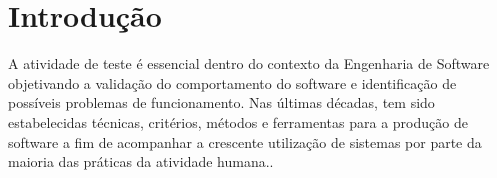 \chapter[Introdução]{Introdução}

	A atividade de teste é essencial dentro do contexto da Engenharia de Software objetivando a validação do comportamento
	do software e identificação de possíveis problemas de funcionamento. Nas últimas décadas, tem sido estabelecidas
	técnicas, critérios, métodos e ferramentas para a produção de software a fim de acompanhar a crescente utilização de
	sistemas por parte da maioria das práticas da atividade humana.\cite{maldonado2004introduccao}.
